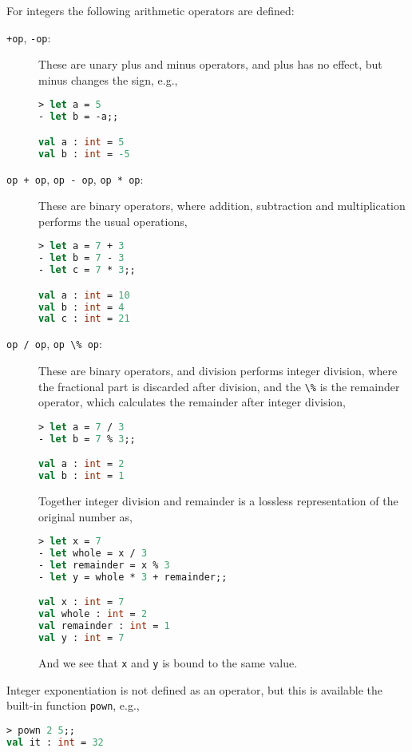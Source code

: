 For integers the following arithmetic operators are defined: 
\begin{description}
\item[\texttt{+op}, \texttt{-op}:] These are unary plus and minus operators, and plus has no effect, but minus changes the sign, e.g.,
%
\begin{lstlisting}[language=fsharp,caption={fsharpi, unary integer negation operator.}]
> let a = 5       
- let b = -a;;

val a : int = 5
val b : int = -5
\end{lstlisting}
\item[\lstinline|op + op|, \lstinline|op - op|, \lstinline|op * op|:] These are binary operators, where addition, subtraction and multiplication performs the usual operations, 
%
\begin{lstlisting}[language=fsharp,caption={fsharpi, binary integer addition, subtraction, and multiplication operators.}]
> let a = 7 + 3
- let b = 7 - 3
- let c = 7 * 3;;

val a : int = 10
val b : int = 4
val c : int = 21
\end{lstlisting}
\item[\lstinline|op / op|, \lstinline|op \% op|:] These are binary operators, and division performs integer division, where the fractional part is discarded after division, and the \lstinline|\%| is the remainder operator, which calculates the remainder after integer division,
%
\begin{lstlisting}[language=fsharp,caption={fsharpi, binary integer division and remainder operators.}]
> let a = 7 / 3
- let b = 7 % 3;;

val a : int = 2
val b : int = 1
\end{lstlisting}
Together integer division and remainder is a lossless representation of the original number as,
%
\begin{lstlisting}[language=fsharp,caption={fsharpi, binary division and remainder is a lossless representation of an integer.}]
> let x = 7
- let whole = x / 3
- let remainder = x % 3
- let y = whole * 3 + remainder;;

val x : int = 7
val whole : int = 2
val remainder : int = 1
val y : int = 7
\end{lstlisting}
And we see that \lstinline|x| and \lstinline|y| is bound to the same value.
\end{description}
Integer exponentiation is not defined as an operator, but this is available the built-in function \lstinline|pown|, e.g.,
%
\begin{lstlisting}[language=fsharp,caption={fsharpi, integer exponentiation function, and the irrelevant identifier.}]
> pown 2 5;;
val it : int = 32
\end{lstlisting}
